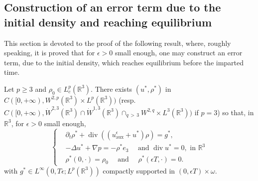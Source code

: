 \documentclass[10pt]{amsart}
\theoremstyle{definition}\newtheorem{defi}[theo]{Definition}\newtheorem{rema}[theo]{Remark}\newtheorem{exam}[theo]{Example}\newtheorem{exem}[theo]{Example}\newtheorem{nota}[theo]{Notation}
\newcommand{\aux}{\mathrm{aux}}
\newcommand{\R}{\mathbb{R}}
\renewcommand{\geq}{\geqslant}
\renewcommand{\div}{\operatorname{div}}
\newcommand{\eps}{\epsilon}
\begin{document}
\subsection{Construction of an error term due to the initial density and reaching equilibrium}

This section is devoted to the proof of the following result, where, roughly speaking, it is proved that for $\eps >0$ small enough, one may construct an error term, due to the initial density, which reaches equilibrium before the imparted time.

\begin{prop}\label{propRn}
Let $p\geq 3$ and $\rho_0 \in L^p_c(\R^3)$. There exists $(u^*, \rho^*) $ in $C([0,+\infty),W^{2,p}(\R^3) \times L^p(\R^3))$ (resp. $C([0,+\infty),\dot{W}^{2,3}(\R^3)\cap \dot{W}^{1,3}(\R^3) \cap_{q\,>\,3}W^{2,q} \times L^3(\R^3))$ if $p=3$) so that, in $\R^3$, for $\eps >0$ small enough,
\begin{equation}\label{ts*}
\left\{
\begin{array}{rcl}
&\partial_t \rho^* + \div ((u^\eps_\aux+u^*)\rho)=g^*,\\
&-\Delta u^* + \nabla p = - \rho^* e_3 \quad \text{ and } \div u^*= 0,\text{ in } \R^3\\
&\rho^*(0,\cdot)=\rho_0 \quad \text{ and } \quad \rho^*(\eps T,\cdot)=0.
\end{array}
\right.
\end{equation}
with $g^*\in L^\infty(0,T\epsilon;L^p(\R^3))$ compactly supported in $(0,\eps T)\times \omega$.
\end{prop}
\end{document}
